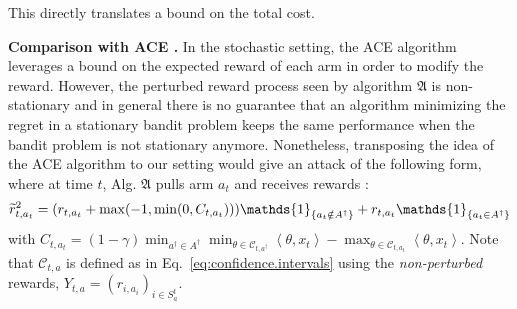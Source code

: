 This directly translates  a bound on the total cost. %

\textbf{Comparison with ACE \cite{liu2019data}.} In the stochastic setting, the ACE algorithm~\cite{liu2019data} leverages a bound on the expected reward of each arm in order to modify the reward. 
However, the perturbed reward process seen by algorithm $\mathfrak{A}$ is non-stationary and in general there is no guarantee that an algorithm minimizing the regret in a stationary bandit problem keeps the same performance when the bandit problem is not stationary anymore. Nonetheless, transposing the idea of the ACE algorithm to our setting would give an attack of the following form, where at time $t$, Alg. $\mathfrak{A}$ pulls arm $a_{t}$ and receives rewards : 
\vspace{-0.2cm}
\begin{align*}
        \wt{r}^{2}_{t, a_{t}} =
                (r_{t, a_{t}} + \max(-1, \min(0, C_{t, a_{t}}))) \mathds{1}_{\{a_t \notin A^\dagger\}} + 
                r_{t, a_t} \mathds{1}_{\{a_t \in A^\dagger\}}
\end{align*}
with $C_{t,a_{t}} = (1 - \gamma)\min_{a^\dagger\in A^\dagger}\min_{\theta \in \mathcal{C}_{t,a^{\dagger}}} \left\langle \theta, x_{t} \right\rangle - \max_{\theta\in\mathcal{C}_{t,a_t}} \left\langle \theta, x_{t}\right\rangle$.
Note that $\mathcal{C}_{t,a}$ is defined as in Eq.~\ref{eq:confidence.intervals} using the \emph{non-perturbed} rewards, \ie $Y_{t,a} = (r_{i,a_i})_{i \in S_a^t}$. 

